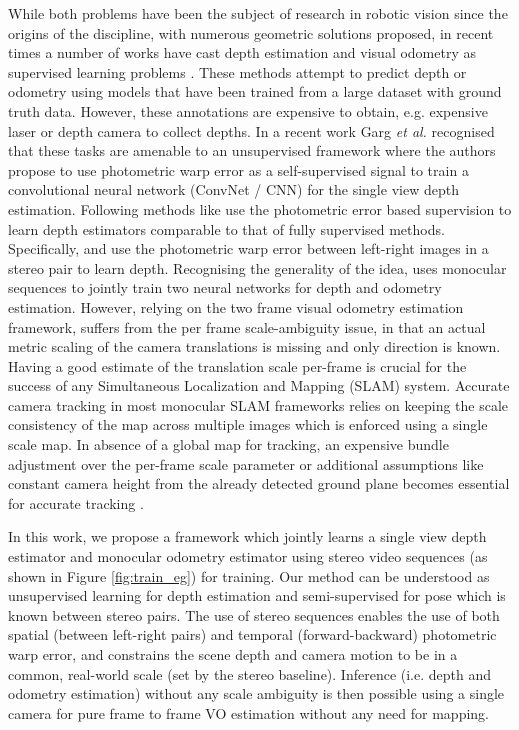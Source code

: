 \documentclass[10pt,twocolumn,letterpaper]{article}
\begin{document}
While both problems have been the subject of research in robotic vision since the origins of the discipline, with numerous geometric solutions proposed, in recent times a number of works have cast depth estimation and visual odometry as supervised learning problems \cite{agrawal2015seebymoving}\cite{eigen2014depth}\cite{liu2015depth}\cite{liu2016depth}. These methods attempt to predict depth or odometry using models that have been trained from a large dataset with ground truth data. 
However, these annotations are expensive to obtain, e.g. expensive laser or depth camera to collect depths. In a recent work Garg \textit{et al.}\cite{garg2016depth}  recognised that these tasks are amenable to an unsupervised framework where the authors propose to use photometric warp error as a self-supervised signal to train a convolutional neural network (ConvNet / CNN) for the single view depth estimation. Following \cite{garg2016depth}  methods like \cite{godard2016depth}\cite{kuznietsov2017semi}\cite{ye2017self} use the photometric error based supervision to learn depth estimators comparable to that of fully supervised methods.
Specifically, \cite{garg2016depth} and \cite{godard2016depth} use the photometric warp error between left-right images in a stereo pair to learn depth. 
Recognising the generality of the idea, \cite{zhou2017sfmlearner} uses monocular sequences to jointly train two neural networks for depth and odometry estimation. 
However, relying on the two frame visual odometry estimation framework, \cite{zhou2017sfmlearner} suffers from the per frame scale-ambiguity issue, in that an actual metric scaling of the camera translations is missing and only direction is known.
Having a good estimate of the translation scale per-frame is crucial for the success of any Simultaneous Localization and Mapping (SLAM) system. Accurate camera tracking in most monocular SLAM frameworks relies on keeping the scale consistency of the map across multiple images which is enforced using a single scale map. In absence of a global map for tracking, an expensive bundle adjustment over the per-frame scale parameter or additional assumptions like constant camera height from the already detected ground plane becomes essential for accurate tracking \cite{song2014robust}.


In this work, we propose a framework which jointly learns a single view depth estimator and monocular odometry estimator using stereo video sequences (as shown in Figure \ref{fig:train_eg})  for training. Our method can be understood as unsupervised learning for depth estimation and semi-supervised for pose which is known between stereo pairs. The use of stereo sequences enables the use of both spatial (between left-right pairs) and temporal (forward-backward) photometric warp error, and constrains the scene depth and camera motion to be in a common, real-world scale (set by the stereo baseline). Inference (i.e. depth and odometry estimation) without any scale ambiguity is then possible using a single camera for pure frame to frame VO estimation without any need for mapping.
\end{document}
